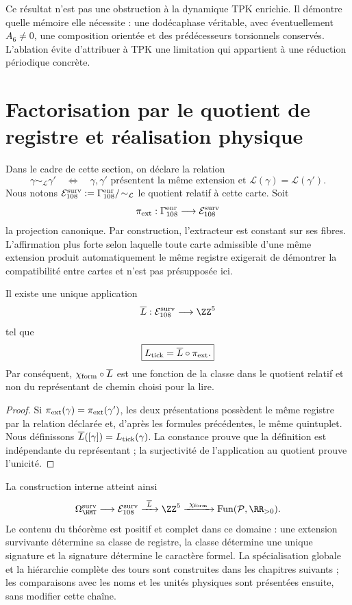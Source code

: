 Ce résultat n'est pas une obstruction à la dynamique TPK enrichie. Il démontre
quelle mémoire elle nécessite : une dodécaphase véritable, avec éventuellement
\(A_6\ne0\), une composition orientée et des prédécesseurs torsionnels conservés. L'ablation
évite d'attribuer à TPK une limitation qui appartient à une réduction
périodique concrète.

\section{Factorisation par le quotient de registre et réalisation physique}

Dans le cadre de cette section, on déclare la relation
\[
\gamma\sim_{\mathcal L}\gamma'
\quad\Longleftrightarrow\quad
\text{\(\gamma,\gamma'\) présentent la même extension et }
\mathcal L(\gamma)=\mathcal L(\gamma').
\]
Nous notons
\(\mathcal E_{108}^{\rm surv}:=
\Gamma_{108}^{\rm enr}/\!\sim_{\mathcal L}\)
le quotient relatif à cette carte. Soit
\[
 \pi_{\rm ext}:\Gamma_{108}^{\rm enr}\longrightarrow
 \mathcal E_{108}^{\rm surv}
\]
la projection canonique. Par construction, l'extracteur est constant sur ses
fibres. L'affirmation plus forte selon laquelle toute carte admissible d'une
même extension produit automatiquement le même registre exigerait de démontrer
la compatibilité entre cartes et n'est pas présupposée ici.

\begin{theorem}
\label{thm:descenso-caracter-extension}
Il existe une unique application
\[
 \overline L:\mathcal E_{108}^{\rm surv}\longrightarrow\ZZ^5
\]
tel que
\[
 \boxed{L_{\rm tick}=\overline L\circ\pi_{\rm ext}.}
\]
Par conséquent, \(\chi_{\rm form}\circ\overline L\) est une fonction de la classe dans
le quotient relatif et non du représentant de chemin choisi pour la lire.
\end{theorem}

\begin{proof}
Si \(\pi_{\rm ext}(\gamma)=\pi_{\rm ext}(\gamma')\), les deux présentations
possèdent le même registre par la relation déclarée et, d'après les formules
précédentes, le même quintuplet. Nous définissons
\(\overline L([\gamma])=L_{\rm tick}(\gamma)\). La constance prouve que la
définition est indépendante du représentant ; la surjectivité de l'application
au quotient prouve l'unicité.
\end{proof}

La construction interne atteint ainsi
\[
 \Omega_{\HMT}^{\rm surv}
 \longrightarrow\mathcal E_{108}^{\rm surv}
 \xrightarrow{\ \overline L\ }\ZZ^5
 \xrightarrow{\ \chi_{\rm form}\ }
 \operatorname{Fun}(\mathcal P,\RR_{>0}).
\]
Le contenu du théorème est positif et complet dans ce domaine : une
extension survivante détermine sa classe de registre, la classe détermine
une unique signature et la signature détermine le caractère formel. La spécialisation
globale et la hiérarchie complète des tours sont construites dans les chapitres
suivants ; les
comparaisons avec les noms et les unités physiques sont présentées ensuite, sans
modifier cette chaîne.
